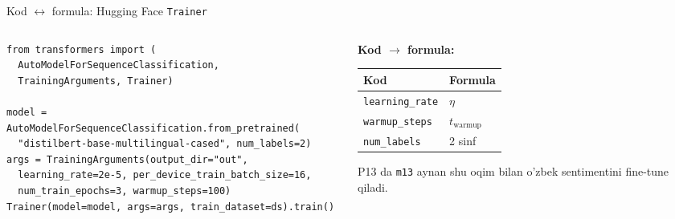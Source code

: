\documentclass[aspectratio=169,11pt]{beamer}
\begin{document}
\begin{frame}[fragile]{Kod $\leftrightarrow$ formula: Hugging Face \texttt{Trainer}}
  \begin{columns}[T]
    \begin{column}{0.66\textwidth}
\begin{lstlisting}
from transformers import (
  AutoModelForSequenceClassification,
  TrainingArguments, Trainer)

model = AutoModelForSequenceClassification.from_pretrained(
  "distilbert-base-multilingual-cased", num_labels=2)
args = TrainingArguments(output_dir="out",
  learning_rate=2e-5, per_device_train_batch_size=16,
  num_train_epochs=3, warmup_steps=100)
Trainer(model=model, args=args, train_dataset=ds).train()
\end{lstlisting}
    \end{column}
    \begin{column}{0.32\textwidth}
      \textbf{Kod $\to$ formula:}\\[3pt]
      \scriptsize
      \begin{tabular}{p{2.0cm}p{1.5cm}}
        \toprule
        Kod & Formula \\
        \midrule
        \texttt{learning\_rate} & $\eta$ \\
        \texttt{warmup\_steps} & $t_{\mathrm{warmup}}$ \\
        \texttt{num\_labels} & 2 sinf \\
        \bottomrule
      \end{tabular}
      \vspace{4pt}
      \begin{tcolorbox}[okbox,top=2pt,bottom=2pt]
        \footnotesize
        P13 da \texttt{m13} aynan shu oqim bilan o'zbek sentimentini fine-tune
        qiladi.
      \end{tcolorbox}
    \end{column}
  \end{columns}
\end{frame}
\end{document}
